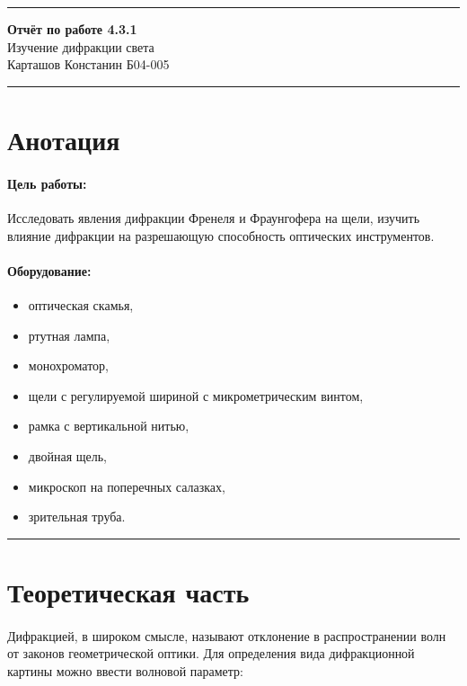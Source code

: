 \documentclass[a4paper,12pt]{article} %
\begin{document}


\hrule 	
\medskip
\begin{raggedright}
{\large \textbf{Отчёт по работе 4.3.1}}
\\
\medskip
{\Large Изучение дифракции света} 
\\
\medskip
{\large Карташов Констанин Б04-005}
\medskip
\hrule
\medskip
\end{raggedright}


\section{Анотация}

\paragraph{Цель работы:} 
Исследовать явления дифракции Френеля и Фраунгофера на щели, изучить влияние дифракции на разрешающую способность оптических инструментов.

\paragraph{Оборудование:}
\begin{itemize}
\renewcommand{\labelitemi}{$\triangleright$}
\itemsep-0.5em
\item оптическая скамья,
\item ртутная лампа,
\item монохроматор, 
\item щели с регулируемой шириной с микрометрическим винтом,
\item рамка с вертикальной нитью,
\item двойная щель,
\item микроскоп на поперечных салазках,
\item зрительная труба.
\end{itemize}


\medskip\hrule\medskip

\section{Теоретическая часть}

\paragraph{} Дифракцией, в широком смысле, называют отклонение в распространении волн от законов геометрической оптики. Для определения вида дифракционной картины можно ввести волновой параметр:
\end{document}
